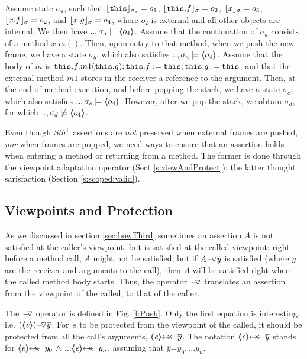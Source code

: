 \begin{example}
\label{ex:motivate:scoped}
Assume state $\sigma_a$, such that $\interpret {\sigma_a} {\prg{this}}=o_1$, $\interpret {\sigma} {\prg{this}.f}=o_2$, $\interpret {\sigma} {x}=o_3$, $\interpret {\sigma} {x.f}=o_2$,  
and $\interpret {\sigma} {x.g}=o_4$, where $o_2$ is external and all other objects are internal. 
We then have $..,\sigma_a \models  \inside {o_4}$.
Assume that the continuation of $\sigma_a$   consists of a method $x.m()$. Then,
upon entry to that method, when we push the new frame, we have a state $\sigma_b$, which also satisfies $..,\sigma_a \models  \inside {o_4}$.
Assume that the   body of $m$ is $\prg{this}.f.m1(\prg{this}.g); \prg{this}.f := \prg{this};  \prg{this}.g := \prg{this}$, and that the external method $m1$ stores in the 
receiver a reference to the argument.
Then, at the end of method execution, and before popping the stack, we have a state $\sigma_c$, which also satisfies $..,\sigma_c \models  \inside {o_4}$.
However, after we pop the stack, we obtain $\sigma_d$, for which $..,\sigma_d \not\models  \inside {o_4}$.
\end{example}


\vspace{.1cm}
Even though  $Stb^+$ assertions    are \emph{not} preserved when  external frames are pushed, \emph{nor} when frames are popped, we need
ways to ensure that an assertion holds when entering a method or returning from a method. 
The former  is done through the viewpoint adaptation operator (Sect \ref{s:viewAndProtect}); the latter thought   
\scoped sarisfaction (Section \ref{s:scoped:valid}).
  
   
 \subsection{Viewpoints and Protection}
 \label{s:preserve:encaps}
 \label{s:viewAndProtect}
 
 As we discussed in section \ref{sec:howThird} sometimes an assertion $A$ is not satisfied at the caller’s
viewpoint, but is satisfied at the called viewpoint:  right before a method call, $A$ might not be satisfied,
but if  $\PushASLong  {\overline y} A$ is satisfied (where $\overline y$ are the receiver and arguments to the call), then $A$
will be satisfied right when the called method body starts. Thus, the operator $\FIXSymbolA$
 translates an assertion from the viewpoint of the called, to that of the caller.
 

The  $\FIXSymbolA$  operator is  defined in Fig. \ref{f:Push}. 
Only the first equation is interesting, i.e.  $\PushAS y {(\inside \re)}$: For 
$\re$ to be protected from the viewpoint of the called, it should be protected from all the call's arguments,
\ie  $\protectedFrom {\re} {\overline {y}}$. 
The notation $\protectedFrom {\re} {\overline {y}}$   stands for $\protectedFrom \re {y_0}\, \wedge\, ...  \protectedFrom \re {y_n}$, assuming that $\overline y$=${y_0, ... y_n}$.


